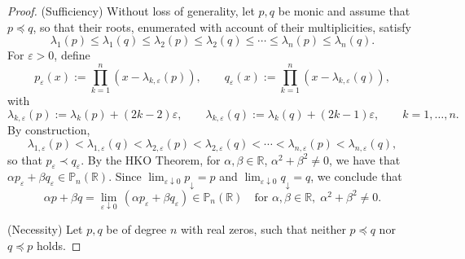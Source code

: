 \documentclass[reqno,11pt]{amsart}
\theoremstyle{remark}
\newcommand{\N}{\mathbb{N}}
\newcommand{\pp}{\mathbb{P}}
\newcommand{\rr}{\mathbb{R}}
\begin{document}
\begin{proof}
(Sufficiency)  Without loss of generality, let $p,q$ be monic and assume that $p \preccurlyeq q$, so that their roots, enumerated with account of their multiplicities, satisfy 
$$
\lambda_1(p) \leq \lambda_1(q) \leq \lambda_2(p) \leq \lambda_2(q) \leq \cdots \leq  \lambda_n(p) \leq \lambda_n(q).
$$
For $\varepsilon>0$, define 
$$
p_\varepsilon(x):= \prod_{k=1}^n \left(x-\lambda_{k,\varepsilon}(p) \right), \qquad  q_\varepsilon(x):= \prod_{k=1}^n \left(x-\lambda_{k,\varepsilon}(q) \right),
$$
with
$$
\lambda_{k,\varepsilon}(p):=  \lambda_k(p)+ (2k-2)\varepsilon ,  \qquad  \lambda_{k,\varepsilon}(q)  :=  \lambda_k(q)+  (2k-1)\varepsilon , \qquad k=1,\dots, n.
$$
By construction,
$$
\lambda_{1,\varepsilon}(p) < \lambda_{1,\varepsilon}(q) < \lambda_{2,\varepsilon}(p) < \lambda_{2,\varepsilon}(q) < \cdots <  \lambda_{n,\varepsilon}(p) < \lambda_{n,\varepsilon}(q),
$$
so that $p_\varepsilon \prec q_\varepsilon$.
By the HKO Theorem, for $\alpha, \beta\in \rr$, $\alpha^2+\beta^2 \neq 0$, we have that $\alpha p_\varepsilon+\beta q_\varepsilon\in \pp_n(\rr)$. Since $\lim_{\varepsilon\downarrow 0 }p_\downarrow=p$ and $\lim_{\varepsilon\downarrow 0}q_\downarrow=q$, we conclude that
$$
\alpha p+\beta q=\lim_{\varepsilon\downarrow 0}\, (\alpha p_\varepsilon+\beta q_\varepsilon)\in \pp_n(\rr)\quad \text{for } \alpha,\beta\in \rr, 
\; \alpha^2+\beta^2 \neq 0.
$$

(Necessity) Let $p, q$ be of degree $n$ with real zeros, such that neither $p \preccurlyeq q$ nor $q \preccurlyeq p$ holds. 


\end{proof}
\end{document}
